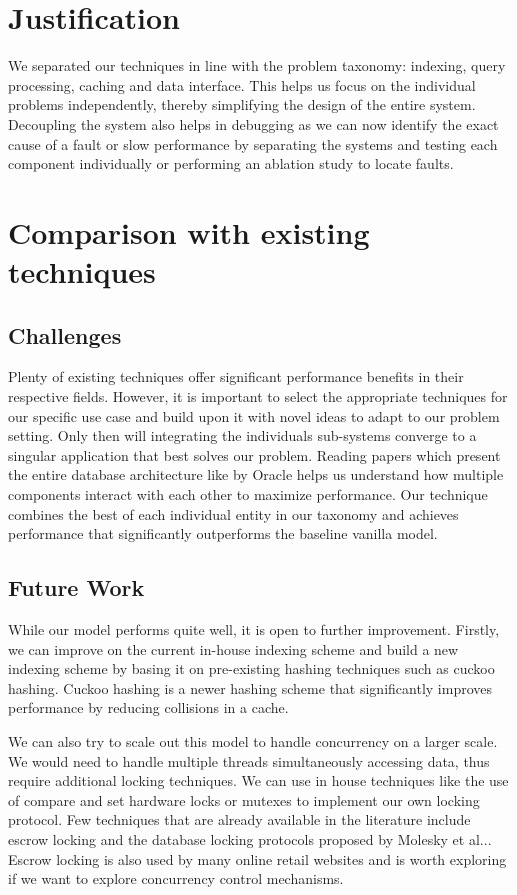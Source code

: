 \section{Justification}
We separated our techniques in line with the problem taxonomy: indexing, query processing, caching and data interface. This helps us focus on the individual problems independently, thereby simplifying the design of the entire system. Decoupling the system also helps in debugging as we can now identify the exact cause of a fault or slow performance by separating the systems and testing each component individually or performing an ablation study to locate faults. 

\section{Comparison with existing techniques}
\subsection{Challenges}
Plenty of existing techniques offer significant performance benefits in their respective fields. However, it is important to select the appropriate techniques for our specific use case and build upon it with novel ideas to adapt to our problem setting. Only then will integrating the individuals sub-systems converge to a singular application that best solves our problem. Reading papers which present the entire database architecture like by Oracle\cite{Oracle} helps us understand how multiple components interact with each other to maximize performance. Our technique combines the best of each individual entity in our taxonomy and achieves performance that significantly outperforms the baseline vanilla model.

\subsection{Future Work}
While our model performs quite well, it is  open to further improvement. Firstly, we can improve on the current in-house indexing scheme and build a new indexing scheme by basing it on pre-existing hashing techniques such as cuckoo hashing\cite{Cuckoo}. Cuckoo hashing is a newer hashing scheme that significantly improves performance by reducing collisions in a cache. 

We can also try to scale out this model to handle concurrency on a larger scale. We would need to handle multiple threads simultaneously accessing data, thus require additional locking techniques. We can use in house techniques like the use of compare and set hardware locks or mutexes to implement our own locking protocol. Few techniques that are already available in the literature include escrow locking\cite{Escrow} and the database locking protocols proposed by Molesky et al..\cite{DatabaseLock}. Escrow locking is also used by many online retail websites and is worth exploring if we want to explore concurrency control mechanisms.

